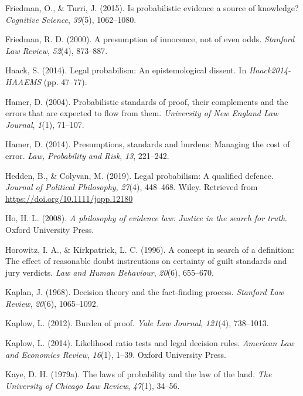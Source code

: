 \documentclass[10pt,dvipsnames,enabledeprecatedfontcommands]{scrartcl}
\begin{document}
\hypertarget{ref-friedman2015}{}
Friedman, O., \& Turri, J. (2015). Is probabilistic evidence a source of
knowledge? \emph{Cognitive Science}, \emph{39}(5), 1062--1080.

\hypertarget{ref-Friedman2000presumption}{}
Friedman, R. D. (2000). A presumption of innocence, not of even odds.
\emph{Stanford Law Review}, \emph{52}(4), 873--887.

\hypertarget{ref-haack2011legal}{}
Haack, S. (2014). Legal probabilism: An epistemological dissent. In
\emph{Haack2014-HAAEMS} (pp. 47--77).

\hypertarget{ref-hamer2004}{}
Hamer, D. (2004). Probabilistic standards of proof, their complements
and the errors that are expected to flow from them. \emph{University of
New England Law Journal}, \emph{1}(1), 71--107.

\hypertarget{ref-hamer2014}{}
Hamer, D. (2014). Presumptions, standards and burdens: Managing the cost
of error. \emph{Law, Probability and Risk}, \emph{13}, 221--242.

\hypertarget{ref-HeddenColyvan2019legal}{}
Hedden, B., \& Colyvan, M. (2019). Legal probabilism: A qualified
defence. \emph{Journal of Political Philosophy}, \emph{27}(4), 448--468.
Wiley. Retrieved from \url{https://doi.org/10.1111/jopp.12180}

\hypertarget{ref-ho2008philosophy}{}
Ho, H. L. (2008). \emph{A philosophy of evidence law: Justice in the
search for truth}. Oxford University Press.

\hypertarget{ref-Horowitz1996}{}
Horowitz, I. A., \& Kirkpatrick, L. C. (1996). A concept in search of a
definition: The effect of reasonable doubt instrcutions on certainty of
guilt standards and jury verdicts. \emph{Law and Human Behaviour},
\emph{20}(6), 655--670.

\hypertarget{ref-Kaplan1968decision}{}
Kaplan, J. (1968). Decision theory and the fact-finding process.
\emph{Stanford Law Review}, \emph{20}(6), 1065--1092.

\hypertarget{ref-kaplow2012}{}
Kaplow, L. (2012). Burden of proof. \emph{Yale Law Journal},
\emph{121}(4), 738--1013.

\hypertarget{ref-kaplow2014likelihood}{}
Kaplow, L. (2014). Likelihood ratio tests and legal decision rules.
\emph{American Law and Economics Review}, \emph{16}(1), 1--39. Oxford
University Press.

\hypertarget{ref-kaye79}{}
Kaye, D. H. (1979a). The laws of probability and the law of the land.
\emph{The University of Chicago Law Review}, \emph{47}(1), 34--56.
\end{document}
